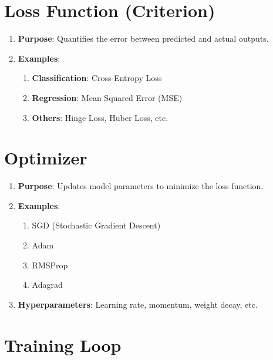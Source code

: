 \section{Loss Function (Criterion)}

\begin{enumerate}
    \item \textbf{Purpose}: Quantifies the error between predicted and actual outputs.
    
    \item \textbf{Examples}:
    \begin{enumerate}
        \item \textbf{Classification}: Cross-Entropy Loss
        \item \textbf{Regression}: Mean Squared Error (MSE)
        \item \textbf{Others}: Hinge Loss, Huber Loss, etc.
    \end{enumerate}
\end{enumerate}
        



\section{Optimizer}

\begin{enumerate}
    \item \textbf{Purpose}: Updates model parameters to minimize the loss function.
    
    \item \textbf{Examples}:
    \begin{enumerate}
        \item SGD (Stochastic Gradient Descent)
        \item Adam
        \item RMSProp
        \item Adagrad
    \end{enumerate}
        
    \item \textbf{Hyperparameters}: Learning rate, momentum, weight decay, etc.
\end{enumerate}



\section{Training Loop}


